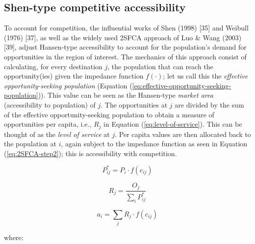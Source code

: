 \documentclass[10pt,letterpaper]{article}
\begin{document}
\hypertarget{shen-type-competitive-accessibility}{%
\subsection{Shen-type competitive
accessibility}\label{shen-type-competitive-accessibility}}

To account for competition, the influential works of Shen (1998)
{[}35{]} and Weibull (1976) {[}37{]}, as well as the widely used 2SFCA
approach of Luo \& Wang (2003) {[}39{]}, adjust Hansen-type
accessibility to account for the population's demand for opportunities
in the region of interest. The mechanics of this approach consist of
calculating, for every destination \(j\), the population that can reach
the opportunity(ies) given the impedance function \(f(\cdot)\); let us
call this the \emph{effective opportunity-seeking population} (Equation
(\ref{eq:effective-opportunity-seeking-population})). This value can be
seen as the Hansen-type \emph{market area} (accessibility to population)
of \(j\). The opportunities at \(j\) are divided by the sum of the
effective opportunity-seeking population to obtain a measure of
opportunities per capita, i.e., \(R_j\) in Equation
(\ref{eq:level-of-service}). This can be thought of as the \emph{level
of service} at \(j\). Per capita values are then allocated back to the
population at \(i\), again subject to the impedance function as seen in
Equation (\ref{eq:2SFCA-step2}); this is accessibility with competition.

\begin{equation}
\label{eq:effective-opportunity-seeking-population}
P_{ij}^{*} = {P_{i} \cdot f(c_{ij})}
\end{equation}

\begin{equation}
\label{eq:level-of-service}
R_{j} = \frac{O_{j}}{\sum_i P_{ij}^*}
\end{equation}

\begin{equation}
\label{eq:2SFCA-step2}
a_{i} = {\sum_j R_{j} \cdot f(c_{ij})}
\end{equation}

\noindent where:
\end{document}
